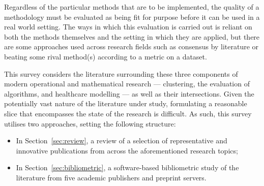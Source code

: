 Regardless of the particular methods that are to be implemented, the quality of
a methodology must be evaluated as being fit for purpose before it can be used
in a real world setting. The ways in which this evaluation is carried out is
reliant on both the methods themselves and the setting in which they are
applied, but there are some approaches used across research fields such as
consensus by literature or beating some rival method(s) according to a metric on
a dataset.

This survey considers the literature surrounding these three components of
modern operational and mathematical research --- clustering, the evaluation of
algorithms, and healthcare modelling --- as well as their intersections. Given
the potentially vast nature of the literature under study, formulating a
reasonable slice that encompasses the state of the research is difficult. As
such, this survey utilises two approaches, setting the following structure:

\begin{itemize}
    \item In Section~\ref{sec:review}, a review of a selection of representative
        and innovative publications from across the aforementioned research
        topics;
    \item In Section~\ref{sec:bibliometric}, a software-based bibliometric study
        of the literature from five academic publishers and preprint servers.
\end{itemize}
